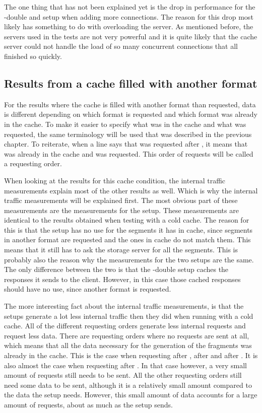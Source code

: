 \documentclass[twoside,openright]{uva-bachelor-thesis}
\begin{document}
The one thing that has not been explained yet is the drop in performance for the
\lt-double and \cdn setup when adding more connections. The reason for this drop
most likely has something to do with overloading the server. As mentioned
before, the servers used in the tests are not very powerful and it is quite
likely that the cache server could not handle the load of so many concurrent
connections that all finished so quickly.

\subsection{Results from a cache filled with another format}
For the results where the cache is filled with another format than
requested, data is different depending on which format is requested and which
format was already in the cache. To make it easier to specify what was in the
cache and what was requested, the same terminology will be used that was
described in the previous chapter. To reiterate, when a
line says that \dash was requested after \iss, it means that \iss was already in
the cache and \dash was requested. This order of requests will be called a
requesting order.

When looking at the results for this cache condition, the internal traffic
measurements explain most of the other results as well. Which is why the
internal traffic measurements will be explained first. The most obvious part of
these measurements are the measurements for the \cdn setup. These measurements
are identical to the results obtained when testing with a cold cache. The reason
for this is that the \cdn setup has no use for the segments it has in cache,
since segments in another format are requested and the ones in cache do not
match them. This means that it still has to ask the storage server for all the
segments. This is probably also the reason why the measurements for the two \lt
setups are the same. The only difference between the two is that the \lt-double
setup caches the responses it sends to the client. However, in this case those
cached responses should have no use, since another format is requested.

The more interesting fact about the internal traffic measurements, is that the
\lt setups generate a lot less internal traffic then they did when running with
a cold cache. All of the different requesting orders generate less internal
requests and request less data. There are requesting orders where no
requests are sent at all, which means that all the data necessary for the
generation of the fragments was already in the cache. This is the case when
requesting \dash after \iss, \iss after \dash and \hds after \hls. It is also
almost the case when requesting \hls after \hds. In that case however, a very
small amount of requests still needs to be sent. All the other requesting orders
still need some data to be sent, although it is a relatively small amount
compared to the data the \cdn setup needs. However, this small amount of data
accounts for a large amount of requests, about as much as the \cdn setup sends.
\end{document}
